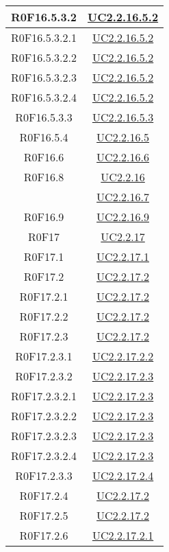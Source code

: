 \documentclass[../AnalisiDeiRequisiti.tex]{subfiles}
\begin{document}
\begin{longtable}{|c|c|}
	R0F16.5.3.2 & \hyperlink{UC2.2.16.5.2}{UC2.2.16.5.2}\\\hline
	R0F16.5.3.2.1 & \hyperlink{UC2.2.16.5.2}{UC2.2.16.5.2}\\\hline
	R0F16.5.3.2.2 & \hyperlink{UC2.2.16.5.2}{UC2.2.16.5.2}\\\hline
	R0F16.5.3.2.3 & \hyperlink{UC2.2.16.5.2}{UC2.2.16.5.2}\\\hline
	R0F16.5.3.2.4 & \hyperlink{UC2.2.16.5.2}{UC2.2.16.5.2}\\\hline
	R0F16.5.3.3 & \hyperlink{UC2.2.16.5.3}{UC2.2.16.5.3}\\\hline
	R0F16.5.4 & \hyperlink{UC2.2.16.5}{UC2.2.16.5}\\\hline
	R0F16.6 & \hyperlink{UC2.2.16.6}{UC2.2.16.6}\\\hline
	R0F16.8 & \hyperlink{UC2.2.16}{UC2.2.16}\\& \hyperlink{UC2.2.16.7}{UC2.2.16.7}\\\hline
	R0F16.9 & \hyperlink{UC2.2.16.9}{UC2.2.16.9}\\\hline
	R0F17 & \hyperlink{UC2.2.17}{UC2.2.17}\\\hline
	R0F17.1 & \hyperlink{UC2.2.17.1}{UC2.2.17.1}\\\hline
	R0F17.2 & \hyperlink{UC2.2.17.2}{UC2.2.17.2}\\\hline
	R0F17.2.1 & \hyperlink{UC2.2.17.2}{UC2.2.17.2}\\\hline
	R0F17.2.2 & \hyperlink{UC2.2.17.2}{UC2.2.17.2}\\\hline
	R0F17.2.3 & \hyperlink{UC2.2.17.2}{UC2.2.17.2}\\\hline
	R0F17.2.3.1 & \hyperlink{UC2.2.17.2.2}{UC2.2.17.2.2}\\\hline
	R0F17.2.3.2 & \hyperlink{UC2.2.17.2.3}{UC2.2.17.2.3}\\\hline
	R0F17.2.3.2.1 & \hyperlink{UC2.2.17.2.3}{UC2.2.17.2.3}\\\hline
	R0F17.2.3.2.2 & \hyperlink{UC2.2.17.2.3}{UC2.2.17.2.3}\\\hline
	R0F17.2.3.2.3 & \hyperlink{UC2.2.17.2.3}{UC2.2.17.2.3}\\\hline
	R0F17.2.3.2.4 & \hyperlink{UC2.2.17.2.3}{UC2.2.17.2.3}\\\hline
	R0F17.2.3.3 & \hyperlink{UC2.2.17.2.4}{UC2.2.17.2.4}\\\hline
	R0F17.2.4 & \hyperlink{UC2.2.17.2}{UC2.2.17.2}\\\hline
	R0F17.2.5 & \hyperlink{UC2.2.17.2}{UC2.2.17.2}\\\hline
	R0F17.2.6 & \hyperlink{UC2.2.17.2.1}{UC2.2.17.2.1}\\\hline

\end{longtable}
\end{document}

